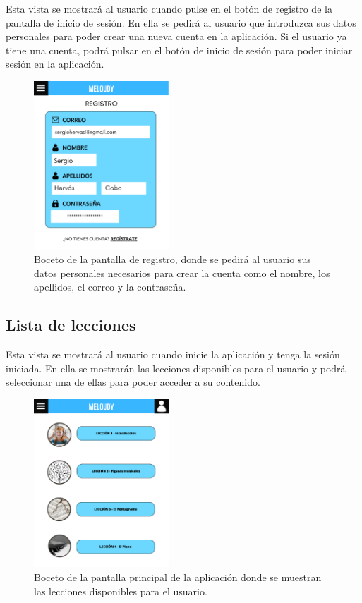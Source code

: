 Esta vista se mostrará al usuario cuando pulse en el botón de registro de la pantalla de inicio de sesión. En ella se pedirá al usuario que introduzca sus datos personales para poder crear una nueva cuenta en la aplicación. Si el usuario ya tiene una cuenta, podrá pulsar en el botón de inicio de sesión para poder iniciar sesión en la aplicación.

\begin{figure}[H]
    \centering
    \centerline{\includegraphics[width=0.45\textwidth, frame]{imagenes/c6/10.png}}
    \caption{Boceto de la pantalla de registro, donde se pedirá al usuario sus datos personales necesarios para crear la cuenta como el nombre, los apellidos, el correo y la contraseña.}
    \label{fig:registro}
\end{figure}


\subsection*{Lista de lecciones}

Esta vista se mostrará al usuario cuando inicie la aplicación y tenga la sesión iniciada. En ella se mostrarán las lecciones disponibles para el usuario y podrá seleccionar una de ellas para poder acceder a su contenido.

\begin{figure}[H]
    \centering
    \centerline{\includegraphics[width=0.45\textwidth, frame]{imagenes/c6/1.png}}
    \caption{Boceto de la pantalla principal de la aplicación donde se muestran las lecciones disponibles para el usuario.}
    \label{fig:pantallaprincipal}
\end{figure}


